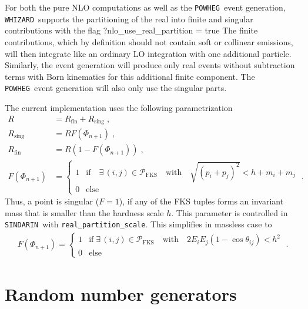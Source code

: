 \documentclass[12pt]{book}
\newenvironment{code}%
  {\begingroup\footnotesize
   \quote
   \Verbatim}%
  {\endVerbatim
   \endquote
   \endgroup\noindent}
\newcommand{\ttt}[1]{\texttt{#1}}
\newcommand{\whizard}{\ttt{WHIZARD}}
\newcommand{\powheg}{\ttt{POWHEG}}
\newcommand{\sindarin}{\ttt{SINDARIN}}
\begin{document}
For both the pure NLO computations as well as the \powheg\ event
generation, \whizard\ supports the partitioning of the real into finite
and singular contributions with the flag
\begin{code}
  ?nlo_use_real_partition = true
\end{code}
The finite contributions, which by definition should not contain soft or
collinear emissions, will then integrate like an ordinary LO integration
with one additional particle.  Similarly, the event generation will
produce only real events without subtraction terms with Born kinematics
for this additional finite component.  The \powheg\ event generation
will also only use the singular parts.

The current implementation uses the following parametrization
\begin{align}
  R                 &= R_{\text{fin}} + R_{\text{sing}} \;,\\
  R_{\text{sing}}     &= R F(\Phi_{n+1}) \;,\\
  R_{\text{fin}}      &= R (1-F(\Phi_{n+1})) \;,\\
  F(\Phi_{n+1})     &=
  \begin{cases}
    1 & \text{if} \quad\exists\,(i,j)\in\mathcal{P}_{\text{FKS}}\quad \text{with} \quad
      \sqrt{(p_i+p_j)^2} < h + m_i + m_j  \\
    0 & \text{else}
  \end{cases} \;.
\end{align}
Thus, a point is {singular ($F=1$)}, if {any} of the {FKS tuples}
forms an {invariant mass} that is {smaller than the hardness scale
$h$}. This parameter is controlled in \sindarin\ with
\ttt{real\_partition\_scale}.
This simplifies in {massless case} to
\begin{align}
  F(\Phi_{n+1}) =
  \begin{cases}
    1 & \text{if} \;\exists\,(i,j)\in\mathcal{P}_{\text{FKS}}\quad \text{with} \quad
      2 E_i E_j (1-\cos\theta_{ij}) < h^2  \\
    0 & \text{else}
  \end{cases} \;.
\end{align}


\chapter{Random number generators}
\label{chap:rng}
\end{document}
